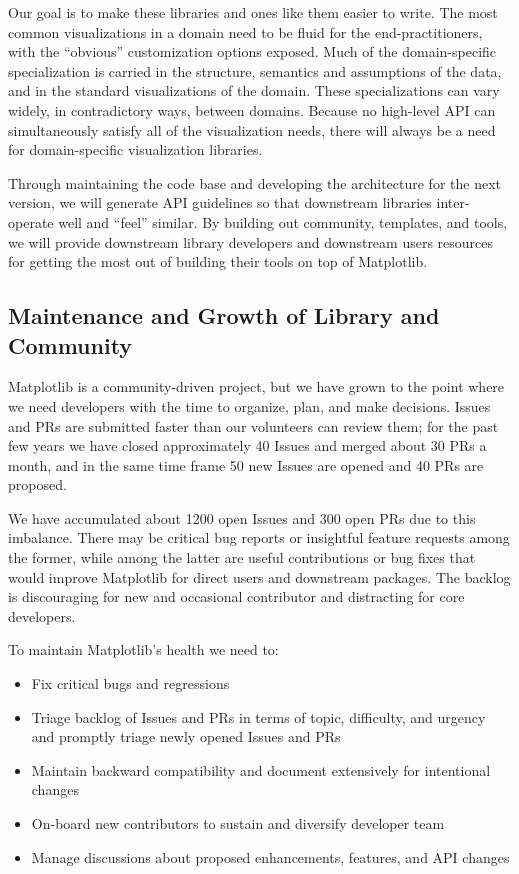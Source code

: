 \documentclass[11pt,letterpaper]{article}  %
\begin{document}
Our goal is to make these libraries and ones like them easier to write.
The most common visualizations in a domain need to be fluid for the end-practitioners, with the ``obvious'' customization options exposed. Much of the domain-specific specialization is carried in the structure, semantics and assumptions of the data, and in the standard visualizations of the domain. These specializations can vary widely, in contradictory ways, between domains. Because no high-level API can simultaneously satisfy all of the visualization needs, there will always be a need for domain-specific visualization libraries.

Through maintaining the code base and developing the architecture for the next version, we will generate API guidelines so that downstream libraries inter-operate well and ``feel'' similar. By building out community, templates, and tools, we will provide downstream library developers and downstream users resources for getting the most out of building their tools on top of Matplotlib. 

\subsection{Maintenance and Growth of Library and Community}

Matplotlib is a community-driven project, but we have grown to the point where we need developers with the time to organize, plan, and make decisions. Issues and PRs are submitted faster than our volunteers can
review them; for the past few years we have closed approximately 40 Issues
and merged about 30 PRs a month, and in the same time frame 50 new Issues are opened and 40 PRs are proposed. 

We have accumulated about 1200 open Issues and 300 open PRs due to this imbalance. There may be critical bug reports or insightful feature requests among the former, while among the latter are useful contributions or bug fixes that would improve Matplotlib for direct users and downstream packages. The backlog is discouraging for new and occasional contributor and distracting for core developers.

To maintain Matplotlib's health we need to:
\begin{itemize}[noitemsep]
\item Fix critical bugs and regressions
\item Triage backlog of Issues and PRs in terms of
  topic, difficulty, and urgency and promptly triage newly
  opened Issues and PRs
\item Maintain backward compatibility and document extensively for intentional changes
\item On-board new contributors to sustain and diversify developer team
\item Manage discussions about proposed enhancements, features, and API changes
\end{itemize}
\end{document}
